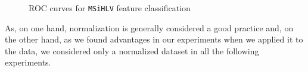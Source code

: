\begin{figure}[!htb]
  \centering
    \hspace{1mm}
    \caption{ROC curves for \texttt{MSiHLV} feature classification}
    \label{ch6:fig2}
\end{figure}




As, on one hand, normalization is generally considered a good practice and, on the other hand, as we found advantages in our experiments when we applied it to the data, we considered 
only a normalized dataset in all the following experiments.

